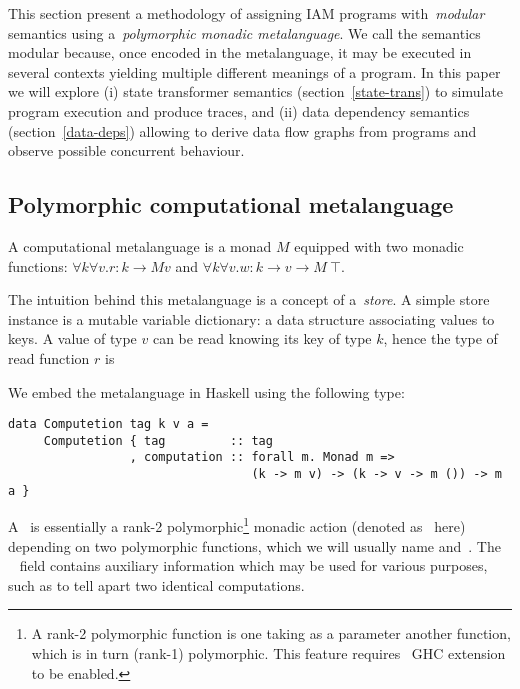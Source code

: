 This section present a methodology of assigning IAM programs with~\emph{modular}
semantics using a~\emph{polymorphic monadic metalanguage}. We call the semantics modular because,
once encoded in the metalanguage, it may be executed in several contexts yielding
multiple different meanings of a program. In this paper we will explore (i)
state transformer semantics (section~\ref{state-trans}) to simulate program
execution and produce traces, and (ii) data dependency semantics
(section~\ref{data-deps}) allowing to derive data flow graphs from programs and
observe possible concurrent behaviour.

\subsection{Polymorphic computational metalanguage}

\begin{definition}
A computational metalanguage is a monad $M$ equipped with two monadic
functions: $\forall k \forall v.r: k \rightarrow M v$ and
$\forall k \forall v.w: k \rightarrow v \rightarrow M~\top$.
\end{definition}

The intuition behind this metalanguage is a concept of a~\emph{store}. A simple
store instance is a mutable variable dictionary: a data structure associating
values to keys. A value of type $v$ can be read knowing its key of type $k$,
hence the type of read function $r$ is

We embed the metalanguage in Haskell using the following type:

\begin{verbatim}
data Computetion tag k v a =
     Computetion { tag         :: tag
                 , computation :: forall m. Monad m =>
                                  (k -> m v) -> (k -> v -> m ()) -> m a }
\end{verbatim}

A~ is essentially a rank-2 polymorphic\footnote{A rank-2 polymorphic
function is one taking as a parameter another function, which is in turn (rank-1)
polymorphic. This feature requires~ GHC extension to be enabled.}
monadic action (denoted as~ here) depending on two polymorphic functions,
which we will usually name  and~.
The ~ field contains auxiliary information which may be used for various
purposes, such as to tell apart two identical computations.


